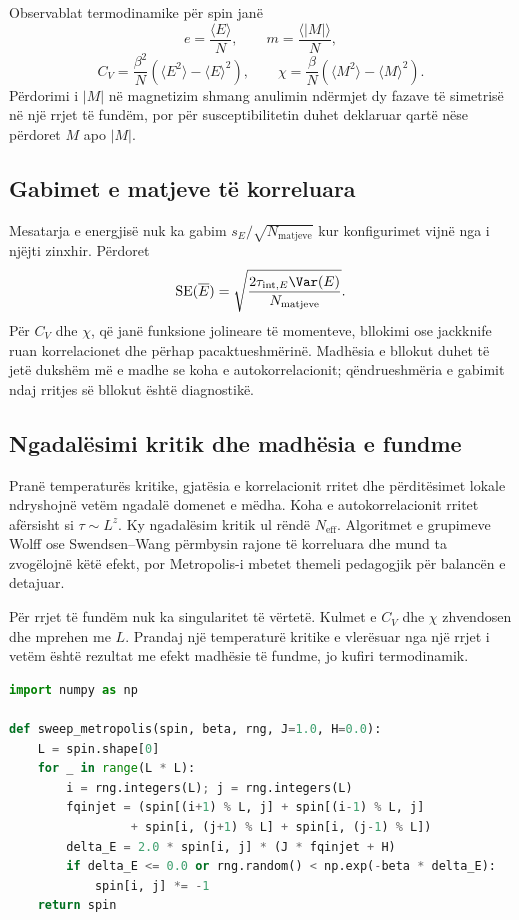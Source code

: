 Observablat termodinamike për spin janë
\begin{equation}
 e=\frac{\langle E\rangle}{N},\qquad
 m=\frac{\langle |M|\rangle}{N},
\end{equation}
\begin{equation}
 C_V=\frac{\beta^2}{N}\left(\langle E^2\rangle-\langle E\rangle^2\right),
 \qquad
 \chi=\frac{\beta}{N}\left(\langle M^2\rangle-\langle M\rangle^2\right).
\end{equation}
Përdorimi i $|M|$ në magnetizim shmang anulimin ndërmjet dy fazave të simetrisë në një rrjet të fundëm, por për susceptibilitetin duhet deklaruar qartë nëse përdoret $M$ apo $|M|$.

\subsection{Gabimet e matjeve të korreluara}
Mesatarja e energjisë nuk ka gabim $s_E/\sqrt{N_{\mathrm{matjeve}}}$ kur konfigurimet vijnë nga i njëjti zinxhir. Përdoret
\begin{equation}
 \operatorname{SE}(\overline E)=
 \sqrt{\frac{2\tau_{\mathrm{int},E}\Var(E)}{N_{\mathrm{matjeve}}}}.
\end{equation}
Për $C_V$ dhe $\chi$, që janë funksione jolineare të momenteve, bllokimi ose jackknife ruan korrelacionet dhe përhap pacaktueshmërinë. Madhësia e bllokut duhet të jetë dukshëm më e madhe se koha e autokorrelacionit; qëndrueshmëria e gabimit ndaj rritjes së bllokut është diagnostikë.

\subsection{Ngadalësimi kritik dhe madhësia e fundme}
Pranë temperaturës kritike, gjatësia e korrelacionit rritet dhe përditësimet lokale ndryshojnë vetëm ngadalë domenet e mëdha. Koha e autokorrelacionit rritet afërsisht si $\tau\sim L^z$. Ky ngadalësim kritik ul rëndë $N_{\mathrm{eff}}$. Algoritmet e grupimeve Wolff ose Swendsen--Wang përmbysin rajone të korreluara dhe mund ta zvogëlojnë këtë efekt, por Metropolis-i mbetet themeli pedagogjik për balancën e detajuar.

Për rrjet të fundëm nuk ka singularitet të vërtetë. Kulmet e $C_V$ dhe $\chi$ zhvendosen dhe mprehen me $L$. Prandaj një temperaturë kritike e vlerësuar nga një rrjet i vetëm është rezultat me efekt madhësie të fundme, jo kufiri termodinamik.

\begin{lstlisting}[language=Python,caption={Një sweep Metropolis për modelin Ising.}]
import numpy as np

def sweep_metropolis(spin, beta, rng, J=1.0, H=0.0):
    L = spin.shape[0]
    for _ in range(L * L):
        i = rng.integers(L); j = rng.integers(L)
        fqinjet = (spin[(i+1) % L, j] + spin[(i-1) % L, j]
                 + spin[i, (j+1) % L] + spin[i, (j-1) % L])
        delta_E = 2.0 * spin[i, j] * (J * fqinjet + H)
        if delta_E <= 0.0 or rng.random() < np.exp(-beta * delta_E):
            spin[i, j] *= -1
    return spin
\end{lstlisting}

